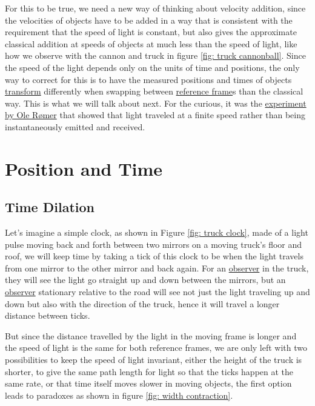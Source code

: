 For this to be true, we need a new way of thinking about velocity addition, since the velocities of objects have to be added in a way that is consistent with the requirement that the speed of light is constant, but also gives the approximate classical addition at speeds of objects at much less than the speed of light, like how we observe with the cannon and truck in figure \ref{fig: truck cannonball}. Since the speed of the light depends only on the units of time and positions, the only way to correct for this is to have the measured positions and times of objects \hyperlink{def-transform}{transform} differently when swapping between \hyperlink{def-Reference-frame}{reference frame}s than the classical way. This is what we will talk about next.
For the curious, it was the \href{https://scienceready.com.au/pages/determination-of-speed-of-light}{experiment by Ole Rømer} that showed that light traveled at a finite speed rather than being instantaneously emitted and received.

\section{Position and Time}

\subsection{Time Dilation}

Let's imagine a simple clock, as shown in Figure \ref{fig: truck clock}, made of a light pulse moving back and forth between two mirrors on a moving truck's floor and roof, we will keep time by taking a tick of this clock to be when the light travels from one mirror to the other mirror and back again. For an \hyperlink{def-observer}{observer} in the truck, they will see the light go straight up and down between the mirrors, but an \hyperlink{def-observer}{observer} stationary relative to the road will see not just the light traveling up and down but also with the direction of the truck, hence it will travel a longer distance between ticks.

But since the distance travelled by the light in the moving frame is longer and the speed of light is the same for both reference frames, we are only left with two possibilities to keep the speed of light invariant, either the height of the truck is shorter, to give the same path length for light so that the ticks happen at the same rate, or that time itself moves slower in moving objects, the first option leads to paradoxes as shown in figure \ref{fig: width contraction}.

